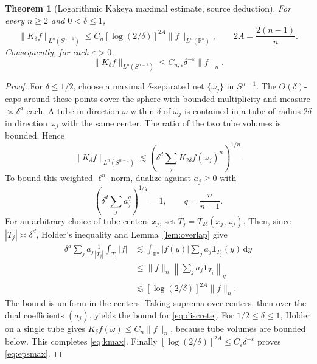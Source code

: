 \documentclass[11pt,a4paper]{article}
\numberwithin{equation}{section}
\newtheorem{theorem}{Theorem}[section]
\theoremstyle{definition}
\theoremstyle{remark}
\newcommand{\R}{\mathbb R}
\newcommand{\eps}{\varepsilon}
\newcommand{\dd}{\,\mathrm d}
\newcommand{\one}{\mathbf 1}
\newcommand{\Sph}{S^{n-1}}
\begin{document}
\begin{theorem}[Logarithmic Kakeya maximal estimate, source deduction]
\label{thm:maximal}
For every $n\ge2$ and $0<\delta\le1$,
\begin{equation}\label{eq:kmax}
 \boxed{\|K_\delta f\|_{L^n(\Sph)}
     \le C_n[\log(2/\delta)]^{2A}\|f\|_{L^n(\R^n)},
     \qquad 2A=\frac{2(n-1)}n.}
\end{equation}
Consequently, for each $\eps>0$,
\begin{equation}\label{eq:epsmax}
 \|K_\delta f\|_{L^n(\Sph)}
          \le C_{n,\eps}\delta^{-\eps}\|f\|_n.
\end{equation}
\end{theorem}
\begin{proof}
For $\delta\le1/2$, choose a maximal $\delta$-separated net
$\{\omega_j\}$ in $\Sph$. The $O(\delta)$-caps around these
points cover the sphere with bounded multiplicity and measure
$\asymp\delta^d$ each. A tube in direction $\omega$ within
$\delta$ of $\omega_j$ is contained in a tube of radius
$2\delta$ in direction $\omega_j$ with the same center.
The ratio of the two tube volumes is bounded. Hence
\begin{equation}\label{eq:discrete}
 \|K_\delta f\|_{L^n(\Sph)}
   \lesssim\left(\delta^d\sum_j
                  K_{2\delta}f(\omega_j)^n\right)^{1/n}.
\end{equation}
To bound this weighted $\ell^n$ norm, dualize against $a_j\ge0$
with
\[\left(\delta^d\sum_j a_j^q\right)^{1/q}=1,
\qquad q=\frac n{n-1}.\]
For an arbitrary choice of tube centers $x_j$, set
$T_j=T_{2\delta}(x_j,\omega_j)$. Then, since
$|T_j|\asymp\delta^d$, Holder's inequality and Lemma~\ref{lem:overlap}
give
\begin{align*}
 \delta^d\sum_j a_j\frac1{|T_j|}\int_{T_j}|f|
 &\lesssim\int_{\R^n}|f(y)|\sum_j a_j\one_{T_j}(y)\dd y\\
 &\le\|f\|_n\left\|\sum_j a_j\one_{T_j}\right\|_q\\
 &\lesssim[\log(2/\delta)]^{2A}\|f\|_n.
\end{align*}
The bound is uniform in the centers. Taking suprema over centers,
then over the dual coefficients $(a_j)$, yields the bound for
\eqref{eq:discrete}. For $1/2\le\delta\le1$, Holder on a single
tube gives $K_\delta f(\omega)\le C_n\|f\|_n$, because tube
volumes are bounded below. This completes \eqref{eq:kmax}.
Finally $[\log(2/\delta)]^{2A}\le C_{\eps}\delta^{-\eps}$
proves \eqref{eq:epsmax}.
\end{proof}
\end{document}
